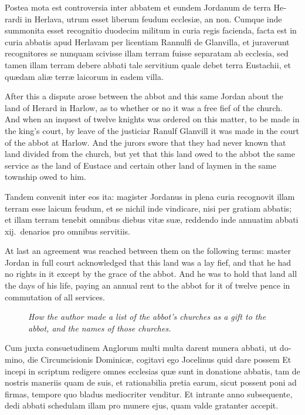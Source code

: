 \documentclass{book}
\newcommand{\blockhead}[4][]{
\begin{figure}
\centering
\vspace{#4}
\parbox{2.75cm}{\begin{center}\footnotesize \color{BrickRed} \emph{#2}\\ #1 \end{center}}
\end{figure}
}
\begin{document}
\begin{paracol}{2}
\switchcolumn*

\begin{otherlanguage}{latin}
Postea mota est controversia inter abbatem et eundem Jordanum de terra Herardi in Herlava, utrum esset liberum feudum ecclesi\ae{}, an non. Cumque inde summonita esset recognitio duodecim militum in curia regis facienda, facta est in curia abbatis apud Herlavam per licentiam Rannulfi de Glanvilla, et juraverunt recognitores se nunquam scivisse illam terram fuisse separatam ab ecclesia, sed tamen illam terram debere abbati tale servitium quale debet terra Eustachii, et qu\ae{}dam ali\ae{} terr\ae{} laicorum in eadem villa. 
\end{otherlanguage}

\switchcolumn

After this a dispute arose between the abbot and this same Jordan about the land of Herard in Harlow, as to whether or no it was a free fief of the church. And when an inquest of twelve knights was ordered on this matter, to be made in the king's court, by leave of the justiciar Ranulf Glanvill it was made in the court of the abbot at Harlow. And the jurors swore that they had never known that land divided from the church, but yet that this land owed to the abbot the same service as the land of Eustace and certain other land of laymen in the same township owed to him.

\switchcolumn*

\begin{otherlanguage}{latin}
Tandem convenit inter eos ita: magister Jordanus in plena curia recognovit illam terram esse laicum feudum, et se nichil inde vindicare, nisi per gratiam abbatis; et illam terram tenebit omnibus diebus vit\ae{} su\ae{}, reddendo inde annuatim abbati xij.\ denarios pro omnibus servitiis.
\end{otherlanguage}

\switchcolumn

At last an agreement was reached between them on the following terms: master Jordan in full court acknowledged that this land was a lay fief, and that he had no rights in it except by the grace of the abbot. And he was to hold that land all the days of his life, paying an annual rent to the abbot for it of twelve pence in commutation of all services.

\switchcolumn*

\begin{otherlanguage}{latin}
\blockhead{How the author made a list of the abbot's churches as a gift to the abbot, and the names of those churches.}{4}{-.65cm}
Cum juxta consuetudinem Anglorum multi multa darent munera abbati, ut domino, die Circumcisionis Dominic\ae{}, cogitavi ego Jocelinus quid dare possem Et incepi in scriptum redigere omnes ecclesias qu\ae{} sunt in donatione abbatis, tam de nostris maneriis  quam de suis, et rationabilia pretia earum, sicut possent poni ad firmas, tempore quo bladus mediocriter venditur. Et intrante anno subsequente, dedi abbati schedulam illam pro munere ejus, quam valde gratanter accepit.


\end{otherlanguage}
\end{paracol}
\end{document}
